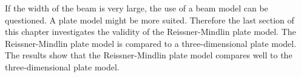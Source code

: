 \documentclass[../main.tex]{subfiles}
\begin{document}
If the width of the beam is very large, the use of a beam model can be questioned. A plate model might be more suited. Therefore the last section of this chapter investigates the validity of the Reissner-Mindlin plate model. The Reissner-Mindlin plate model is compared to a three-dimensional plate model. The results show that the Reissner-Mindlin plate model compares well to the three-dimensional plate model.
\end{document}
